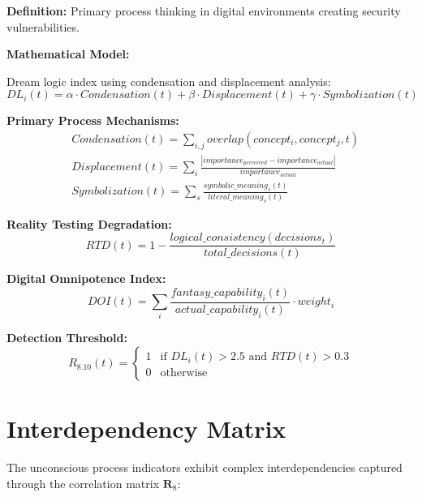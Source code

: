 \documentclass[11pt,a4paper]{article}
\begin{document}
\textbf{Definition:} Primary process thinking in digital environments creating security vulnerabilities.

\textbf{Mathematical Model:}

Dream logic index using condensation and displacement analysis:
\begin{equation}
DL_i(t) = \alpha \cdot Condensation(t) + \beta \cdot Displacement(t) + \gamma \cdot Symbolization(t)
\end{equation}

\textbf{Primary Process Mechanisms:}
\begin{align}
&Condensation(t) = \sum_{i,j} overlap(concept_i, concept_j, t) \\
&Displacement(t) = \sum_{i} \frac{|importance_{perceived} - importance_{actual}|}{importance_{actual}} \\
&Symbolization(t) = \sum_{s} \frac{symbolic\_meaning_s(t)}{literal\_meaning_s(t)}
\end{align}

\textbf{Reality Testing Degradation:}
\begin{equation}
RTD(t) = 1 - \frac{logical\_consistency(decisions_t)}{total\_decisions(t)}
\end{equation}

\textbf{Digital Omnipotence Index:}
\begin{equation}
DOI(t) = \sum_{i} \frac{fantasy\_capability_i(t)}{actual\_capability_i(t)} \cdot weight_i
\end{equation}

\textbf{Detection Threshold:}
\begin{equation}
R_{8.10}(t) = \begin{cases}
1 & \text{if } DL_i(t) > 2.5 \text{ and } RTD(t) > 0.3 \\
0 & \text{otherwise}
\end{cases}
\end{equation}

\section{Interdependency Matrix}

The unconscious process indicators exhibit complex interdependencies captured through the correlation matrix $\mathbf{R}_{8}$:
\end{document}
